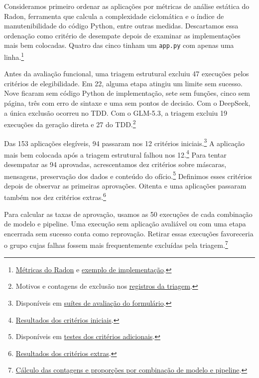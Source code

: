 \documentclass[a4paper,12pt,twoside,english,brazilian]{book}
\begin{document}
Consideramos primeiro ordenar as aplicações por métricas de análise
estática do Radon, ferramenta que calcula a complexidade ciclomática e o
índice de manutenibilidade do código Python, entre outras medidas.
Descartamos essa ordenação como critério de desempate depois de examinar as
implementações mais bem colocadas. Quatro das cinco tinham um
\texttt{app.py} com apenas uma linha.\footnote{\href{https://github.com/Educg550/tcc/blob/ee6d001c1f618419c6184644d18aa97bb33bcf9a/demos/runs/batch/radon.json}{Métricas do Radon} e
\href{https://github.com/Educg550/tcc/blob/ee6d001c1f618419c6184644d18aa97bb33bcf9a/demos/runs/batch/glm/run12/baseline/app.py}{exemplo de implementação}.}

Antes da avaliação funcional, uma triagem estrutural excluiu 47 execuções
pelos critérios de elegibilidade. Em 22, alguma etapa atingiu um limite sem
sucesso. Nove ficaram sem código Python de implementação, sete sem funções,
cinco sem página, três com erro de sintaxe e uma sem pontos de decisão.
Com o DeepSeek, a única exclusão ocorreu no TDD. Com o GLM-5.3, a triagem
excluiu 19 execuções da geração direta e 27 do TDD.\footnote{Motivos
e contagens de exclusão nos \href{https://github.com/Educg550/tcc/blob/ee6d001c1f618419c6184644d18aa97bb33bcf9a/demos/runs/batch/radon.json}{registros da triagem}.}

Das 153 aplicações elegíveis, 94 passaram nos 12 critérios
iniciais.\footnote{Disponíveis em \href{https://github.com/Educg550/tcc/tree/ee6d001c1f618419c6184644d18aa97bb33bcf9a/demos/avaliacao}{suítes de avaliação do formulário}.}
A aplicação mais bem colocada após a triagem estrutural falhou nos
12.\footnote{\href{https://github.com/Educg550/tcc/blob/ee6d001c1f618419c6184644d18aa97bb33bcf9a/demos/runs/batch/cypress.json}{Resultados dos critérios iniciais}.}
Para tentar desempatar as 94 aprovadas, acrescentamos dez critérios sobre
máscaras, mensagens, preservação dos dados e conteúdo do ofício.\footnote{Disponíveis em
\href{https://github.com/Educg550/tcc/tree/ee6d001c1f618419c6184644d18aa97bb33bcf9a/demos/avaliacao/extra}{testes dos critérios adicionais}.}
Definimos esses critérios depois de observar as primeiras aprovações.
Oitenta e uma aplicações passaram também nos dez critérios extras.\footnote{\href{https://github.com/Educg550/tcc/blob/ee6d001c1f618419c6184644d18aa97bb33bcf9a/demos/runs/batch/cypress-extra.json}{Resultados dos critérios extras}.}

Para calcular as taxas de aprovação, usamos as 50 execuções de cada
combinação de modelo e pipeline. Uma execução sem aplicação avaliável ou
com uma etapa encerrada sem sucesso conta como reprovação. Retirar essas
execuções favoreceria o grupo cujas falhas fossem mais frequentemente excluídas
pela triagem.\footnote{\href{https://github.com/Educg550/tcc/blob/ee6d001c1f618419c6184644d18aa97bb33bcf9a/tex/figuras/graficos-formulario.py}{Cálculo das contagens e proporções por combinação de modelo e pipeline}.}
\end{document}
